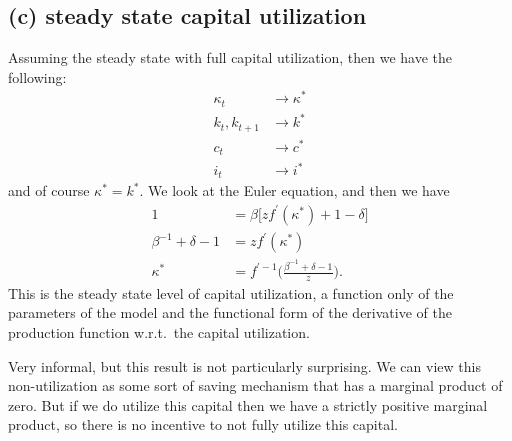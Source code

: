 \documentclass[a4paper]{article}
\theoremstyle{definition}
\begin{document}
\subsection{(c) steady state capital utilization}
Assuming the steady state with full capital utilization, then we have the following:
	\begin{align*}
	\kappa_t 					&\rightarrow \kappa^* \\
	k_t ,k_{t+1}				&\rightarrow k^* \\
	c_t 						&\rightarrow c^* \\
	i_t 							&\rightarrow i^* 
	\end{align*}
and of course $\kappa^* = k^*$. We look at the Euler equation, and then we have
	\begin{align*}
	1 							&= \beta \big[ z f^\prime(\kappa^*)+1-\delta \big] \\
	\beta^{-1} +\delta-1	&= z f^\prime (\kappa^*) \\
	\kappa^* 				&= f^{\prime -1} \Big( \frac{\beta^{-1} + \delta - 1}{z} \Big).
	\end{align*}	
This is the steady state level of capital utilization, a function only of the parameters of the model and the functional form of the derivative of the production function w.r.t.\ the capital utilization.	

Very informal, but this result is not particularly surprising. We can view this non-utilization as some sort of saving mechanism that has a marginal product of zero. But if we do utilize this capital then we have a strictly positive marginal product, so there is no incentive to not fully utilize this capital.
%
%
%
%
%
%
%
%
%
%
%
%
%
\newpage
\end{document}
